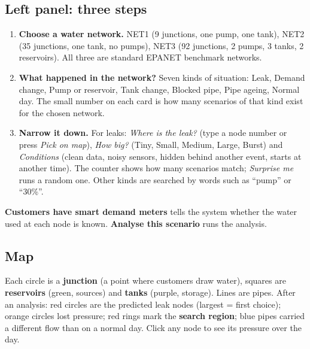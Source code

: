 \documentclass[11pt,a4paper]{article}
\newcommand{\term}[1]{\textbf{#1}}
\begin{document}
\subsection{Left panel: three steps}
\begin{enumerate}[leftmargin=*,itemsep=2pt]
\item \term{Choose a water network.} NET1 (9 junctions, one pump, one tank), NET2 (35 junctions, one tank, no pumps), NET3 (92 junctions, 2 pumps, 3 tanks, 2 reservoirs). All three are standard EPANET benchmark networks.
\item \term{What happened in the network?} Seven kinds of situation: Leak, Demand change, Pump or reservoir, Tank change, Blocked pipe, Pipe ageing, Normal day. The small number on each card is how many scenarios of that kind exist for the chosen network.
\item \term{Narrow it down.} For leaks: \emph{Where is the leak?} (type a node number or press \emph{Pick on map}), \emph{How big?} (Tiny, Small, Medium, Large, Burst) and \emph{Conditions} (clean data, noisy sensors, hidden behind another event, starts at another time). The counter shows how many scenarios match; \emph{Surprise me} runs a random one. Other kinds are searched by words such as ``pump'' or ``30\%''.
\end{enumerate}
\term{Customers have smart demand meters} tells the system whether the water used at each node is known. \term{Analyse this scenario} runs the analysis.

\subsection{Map}
Each circle is a \term{junction} (a point where customers draw water), squares are \term{reservoirs} (green, sources) and \term{tanks} (purple, storage). Lines are pipes. After an analysis: red circles are the predicted leak nodes (largest = first choice); orange circles lost pressure; red rings mark the \term{search region}; blue pipes carried a different flow than on a normal day. Click any node to see its pressure over the day.
\end{document}
